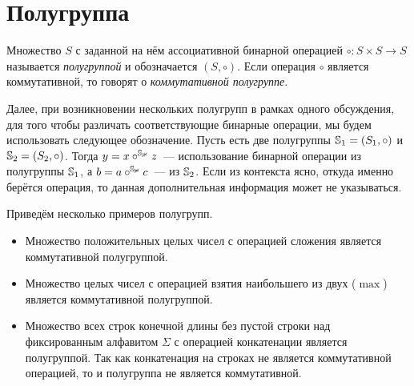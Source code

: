 \section{Полугруппа}
\label{sec:Semigroup}

\begin{definition}[Полугруппа]
    Множество $S$ с заданной на нём ассоциативной бинарной операцией $\circ: S \times S \to S$ называется \emph{полугруппой} и обозначается $(S, \circ)$.
    Если операция $\circ$ является коммутативной, то говорят о \emph{коммутативной полугруппе}.
\end{definition}

Далее, при возникновении нескольких полугрупп в рамках одного обсуждения, для того чтобы различать соответствующие бинарные операции, мы будем использовать следующее обозначение.
Пусть есть две полугруппы $\mathbb{S}_1=(S_1,\circ)$ и $\mathbb{S}_2=(S_2,\circ)$.
Тогда $y = x \circ^{\mathbb{\mathbb{S}_1}} z $~--- использование бинарной операции из полугруппы $\mathbb{S}_1$, а $b = a \circ^{\mathbb{\mathbb{S}_2}} c$~--- из $\mathbb{S}_2$.
Если из контекста ясно, откуда именно берётся операция, то данная дополнительная информация может не указываться.

\begin{example}
    Приведём несколько примеров полугрупп.
    \begin{itemize}
        \item Множество положительных целых чисел с операцией сложения является коммутативной полугруппой.
        \item Множество целых чисел с операцией взятия наибольшего из двух ($\max$) является коммутативной полугруппой.
        \item Множество всех строк конечной длины без пустой строки%
              над фиксированным алфавитом $\Sigma$ с операцией конкатенации является полугруппой.
              Так как конкатенация на строках не является коммутативной операцией, то и полугруппа не является коммутативной.
    \end{itemize}
\end{example}
